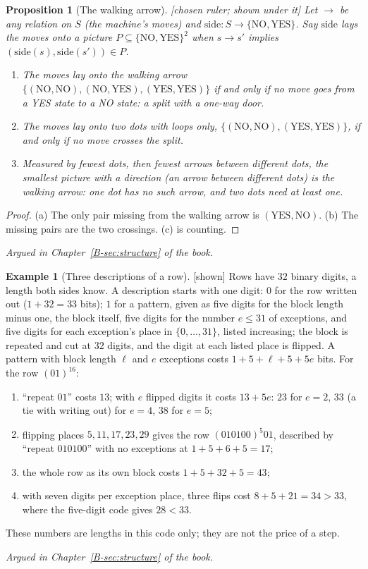 \documentclass[11pt, a4paper]{article}
\theoremstyle{plain}
\newtheorem{proposition}[theorem]{Proposition}
\theoremstyle{definition}
\newtheorem{example}[theorem]{Example}
\theoremstyle{remark}
\newcommand{\argued}[1]{\par\noindent\textit{Argued in Chapter~\ref{B-#1} of the book.}\par}
\newcommand{\kind}[1]{\textup{[#1]}}
\begin{document}
\begin{proposition}[The walking arrow]\label{spec:walking-arrow} \kind{chosen ruler; shown under it}
Let $\to$ be any relation on $S$ (the machine's moves) and $\mathrm{side}:S\to\{\mathrm{NO},\mathrm{YES}\}$.
Say $\mathrm{side}$ lays the moves onto a picture $P\subseteq\{\mathrm{NO},\mathrm{YES}\}^2$ when $s\to s'$
implies $(\mathrm{side}(s),\mathrm{side}(s'))\in P$.
\begin{enumerate}[label=(\alph*)]
\item The moves lay onto the walking arrow
$\{(\mathrm{NO},\mathrm{NO}),(\mathrm{NO},\mathrm{YES}),(\mathrm{YES},\mathrm{YES})\}$ if and only if no move goes
from a YES state to a NO state: a split with a one-way door.
\item The moves lay onto two dots with loops only, $\{(\mathrm{NO},\mathrm{NO}),(\mathrm{YES},\mathrm{YES})\}$,
if and only if no move crosses the split.
\item Measured by fewest dots, then fewest arrows between different dots, the smallest picture with a
direction (an arrow between different dots) is the walking arrow: one dot has no such arrow, and two dots need
at least one.
\end{enumerate}
\end{proposition}
\begin{proof}
(a) The only pair missing from the walking arrow is $(\mathrm{YES},\mathrm{NO})$. (b) The missing pairs are
the two crossings. (c) is counting.
\end{proof}
\argued{sec:structure}

\begin{example}[Three descriptions of a row]\label{spec:mdl} \kind{shown}
Rows have $32$ binary digits, a length both sides know. A description starts with one digit: $0$ for the row
written out ($1+32=33$ bits); $1$ for a pattern, given as five digits for the block length minus one, the block
itself, five digits for the number $e\le31$ of exceptions, and five digits for each exception's place in
$\{0,\dots,31\}$, listed increasing; the block is repeated and cut at $32$ digits, and the digit at each listed
place is flipped. A pattern with block length $\ell$ and $e$ exceptions costs $1+5+\ell+5+5e$ bits. For the
row $(01)^{16}$:
\begin{enumerate}[label=(\alph*)]
\item ``repeat $01$'' costs $13$; with $e$ flipped digits it costs $13+5e$: $23$ for $e=2$, $33$ (a tie with
writing out) for $e=4$, $38$ for $e=5$;
\item flipping places $5,11,17,23,29$ gives the row $(010100)^{5}01$, described by ``repeat $010100$''
with no exceptions at $1+5+6+5=17$;
\item the whole row as its own block costs $1+5+32+5=43$;
\item with seven digits per exception place, three flips cost $8+5+21=34>33$, where the five-digit code gives
$28<33$.
\end{enumerate}
These numbers are lengths in this code only; they are not the price of a step.
\end{example}
\argued{sec:structure}
\end{document}
